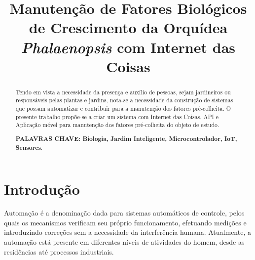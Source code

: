 \documentclass[conference]{IEEEtran}
\begin{document}
\title{Manutenção de Fatores Biológicos de Crescimento da Orquídea {\itshape{Phalaenopsis}} com Internet das Coisas}


\author{
\and
{}
\and
{}
\and
{}
}

\maketitle

\begin{abstract}
Tendo em vista a necessidade da presença e auxílio de pessoas, sejam jardineiros ou responsáveis pelas plantas e jardins, nota-se a necessidade da construção de sistemas que possam automatizar e contribuir para a manutenção dos fatores pré-colheita. O presente trabalho propõe-se a criar um sistema com Internet das Coisas, API e Aplicação móvel para manutenção dos fatores pré-colheita do objeto de estudo. 

\textbf{PALAVRAS CHAVE: Biologia, Jardim Inteligente, Microcontrolador, IoT, Sensores}.
\end{abstract}

\section{Introdução}

Automação é a denominação dada para sistemas automáticos de controle, pelos quais os mecanismos verificam seu próprio funcionamento, efetuando medições e introduzindo correções sem a necessidade da interferência humana. Atualmente, a automação está presente em diferentes níveis de atividades do homem, desde as residências até processos industriais.
\end{document}

